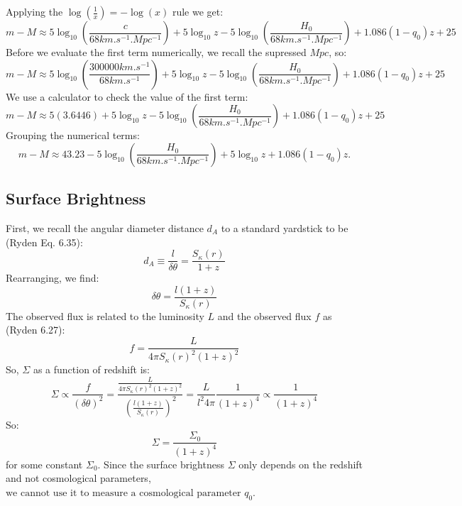 Applying the $\log(\frac{1}{x}) = -\log(x)$ rule we get:
\begin{equation}
    m - M \approx 5\log_{10}\left(\frac{c}{68 \si{km.s^{-1}.Mpc^{-1}}}\right) + 5\log_{10}z - 5\log_{10}\left(\frac{H_0}{68 \si{km.s^{-1}.Mpc^{-1}}}\right) + 1.086(1-q_0)z +  25
\end{equation}
Before we evaluate the first term numerically, we recall the supressed $\si{Mpc}$, so:
\begin{equation}
    m - M \approx 5\log_{10}\left(\frac{300000\si{km.s^{-1}}}{68 \si{km.s^{-1}}}\right) + 5\log_{10}z - 5\log_{10}\left(\frac{H_0}{68 \si{km.s^{-1}.Mpc^{-1}}}\right) + 1.086(1-q_0)z +  25
\end{equation}
We use a calculator to check the value of the first term:
\begin{equation}
    m - M \approx 5(3.6446) + 5\log_{10}z - 5\log_{10}\left(\frac{H_0}{68 \si{km.s^{-1}.Mpc^{-1}}}\right) + 1.086(1-q_0)z +  25
\end{equation}
Grouping the numerical terms:
\begin{equation}
    \boxed{m - M \approx 43.23 - 5\log_{10}\left(\frac{H_0}{68 \si{km.s^{-1}.Mpc^{-1}}}\right) + 5\log_{10}z + 1.086(1-q_0)z}.
\end{equation}

\subsection{Surface Brightness}
First, we recall the angular diameter distance $d_A$ to a standard yardstick to be (Ryden Eq. 6.35):
\begin{equation}
    d_A \equiv \frac{l}{\delta \theta} = \frac{S_\kappa(r)}{1 + z}
\end{equation}
Rearranging, we find:
\begin{equation}
    \delta \theta = \frac{l(1 + z)}{S_\kappa(r)}
\end{equation}
The observed flux is related to the luminosity $L$ and the observed flux $f$ as (Ryden 6.27):
\begin{equation}
    f = \frac{L}{4\pi S_\kappa(r)^2 (1+z)^2}
\end{equation}
So, $\Sigma$ as a function of redshift is:
\begin{equation}
    \Sigma \propto \frac{f}{(\delta \theta)^2} = \frac{\frac{L}{4\pi S_\kappa(r)^2 (1+z)^2}}{\left(\frac{l(1 + z)}{S_\kappa(r)}\right)^2} = \frac{L}{l^2 4\pi} \frac{1}{(1+z)^4} \propto \frac{1}{(1+z)^4}
\end{equation}
So:
\begin{equation}
    \boxed{\Sigma = \frac{\Sigma_0}{(1+ z)^4}}
\end{equation}
for some constant $\Sigma_0$. Since the surface brightness $\Sigma$ only depends on the redshift and not cosmological parameters, $\boxed{\text{we cannot use it to measure a cosmological parameter $q_0$}}$.

